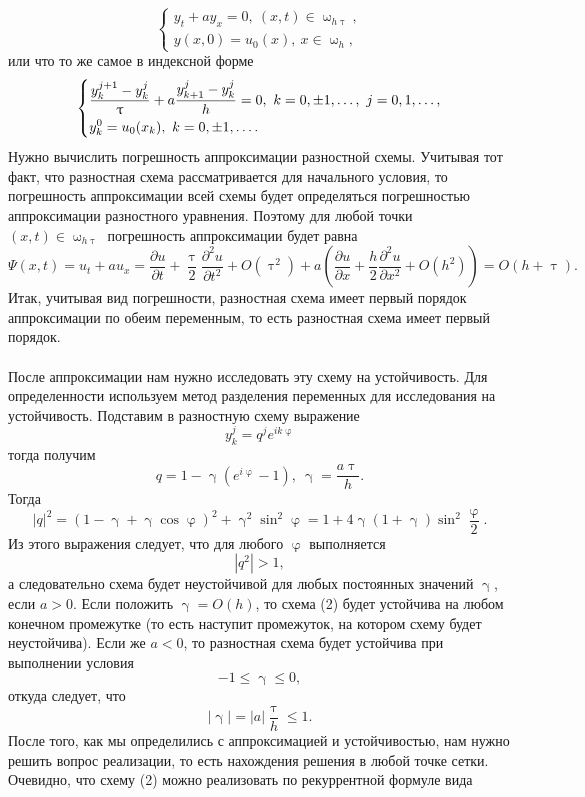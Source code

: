 \documentclass[a4paper, 12pt]{report}
\numberwithin{equation}{section}
\renewcommand{\leq}{\leqslant}
\renewcommand{\gamma}{\upgamma}
\renewcommand{\varphi}{\upvarphi}
\renewcommand{\tau}{\uptau}
\renewcommand{\omega}{\upomega}
\renewcommand{\d}{\partial}
\begin{document}
 \begin{equation}
	 	\begin{cases}
	 	y_t + ay_x = 0,\ (x,t) \in \omega_{h\tau},\\
	 	y(x,0) = u_0(x),\ x \in \omega_h,
 \end{cases}
 \end{equation}
 или что то же самое в индексной форме
 $$\begin{dcases}
	 	\dfrac{y_k^{j+1}-y_k^j}{\tau} + a \dfrac{y_{k+1}^j - y_{k}^j}{h} = 0,\ k =0,\pm1,\ldots,\ j = 0,1,\ldots,\\
	 	y_k^0 = u_0(x_k),\ k =0,\pm1,\ldots.
 \end{dcases}$$
 Нужно вычислить погрешность аппроксимации разностной схемы. Учитывая тот факт, что разностная схема рассматривается для начального условия, то погрешность аппроксимации всей схемы будет определяться погрешностью аппроксимации разностного уравнения. Поэтому для любой точки $(x,t) \in \omega_{h\tau}$ погрешность аппроксимации будет равна
 $$\Psi(x,t) = u_t + au_x = \dfrac{\d u}{\d t} + \dfrac \tau 2 \dfrac{\d ^2 u}{\d t^2} + O(\tau^2) + a \left(\dfrac{\d u}{\d x} + \dfrac h 2 \dfrac{\d ^2 u}{\d x^2} + O(h^2) \right) = O(h+\tau).$$
 Итак, учитывая вид погрешности, разностная схема имеет первый порядок аппроксимации по обеим переменным, то есть разностная схема имеет первый порядок.\\\\
 После аппроксимации нам нужно исследовать эту схему на устойчивость. Для определенности используем метод разделения переменных для исследования на устойчивость. Подставим в разностную схему выражение
 $$y_k^j = q^j e^{ik\varphi}$$
 тогда получим
 $$q = 1-\gamma(e^{i\varphi} -1),\ \gamma = \dfrac {a\tau}h.$$
 Тогда
 $$|q|^2 = (1-\gamma + \gamma \cos \varphi)^2 + \gamma^2 \sin^2 \varphi = 1 + 4 \gamma (1+\gamma)\sin ^2 \dfrac \varphi2.$$
 Из этого выражения следует, что для любого $\varphi$ выполняется
 $$|q^2|>1,$$
 а следовательно схема будет неустойчивой для любых постоянных значений $\gamma$, если $a > 0$. Если положить $\gamma = O(h)$, то схема (2) будет устойчива на любом конечном промежутке (то есть наступит промежуток, на котором схему будет неустойчива). Если же $a < 0$, то разностная схема будет устойчива при выполнении условия $$-1 \leq \gamma \leq 0,$$
 откуда следует, что $$|\gamma| = |a|\dfrac \tau h \leq 1.$$
 После того, как мы определились с аппроксимацией и устойчивостью, нам нужно решить вопрос реализации, то есть нахождения решения в любой точке сетки. Очевидно, что схему (2) можно реализовать по рекуррентной формуле вида
\end{document}
